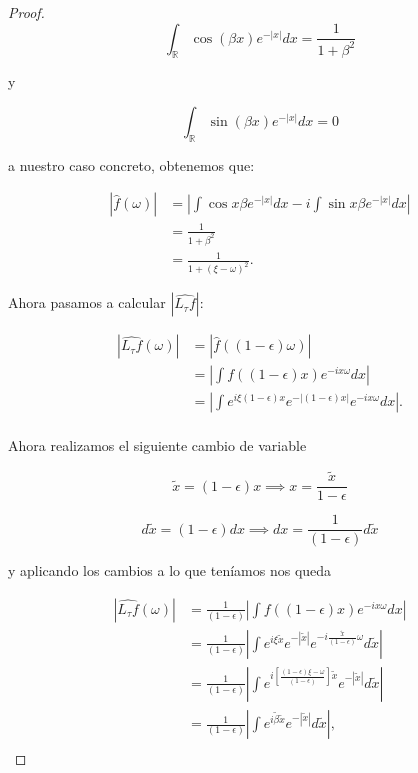 \begin{proof}
\begin{equation} \label{eq:res_auxiliar_1}
  \int_\mathbb{R} \cos(\beta x) e^{-|x|} dx= \frac{1}{1+\beta^2}
\end{equation}

\noindent y 

\begin{equation}\label{eq:res_auxiliar_2}
  \int_\mathbb{R} \sin(\beta x) e^{-|x|} dx= 0
\end{equation}

\noindent a nuestro caso concreto, obtenemos que: 

\begin{align*}
  |\widehat{f}(\omega)|&=\left|  \int{\cos{x\beta}e^{-|x|} dx} - i \int{\sin{x\beta}e^{-|x|} dx} \right| \\
  &=\frac{1}{1+\beta^2} \\
  &=\frac{1}{1+(\xi - \omega)^2}.
\end{align*} 

\noindent Ahora pasamos a calcular $|\widehat{L_\tau f}|$:

\begin{align*}
  |\widehat{L_\tau f}(\omega)| &= |\widehat{f}((1-\epsilon)\omega)| \\
  &=\left|  \int{f((1-\epsilon)x)e^{-ix\omega}dx}  \right | \\
  &=\left|  \int{e^{i \xi (1-\epsilon) x}e^{-|(1-\epsilon)x|}e^{-ix\omega}dx}  \right |. \\
\end{align*}

\noindent Ahora realizamos el siguiente cambio de variable

\begin{equation}
  \tilde{x}=(1-\epsilon) x \implies x=\frac{\tilde{x}}{1-\epsilon} 
\end{equation}

\begin{equation}
 d\tilde{x}=(1-\epsilon) dx \implies dx=\frac{1}{(1-\epsilon)}d\tilde{x}
\end{equation}

\noindent y aplicando los cambios a lo que teníamos nos queda

\begin{align*}
  |\widehat{L_\tau f}(\omega)| 
  &= \frac{1}{(1-\epsilon)}\left|  \int{f((1-\epsilon)x)e^{-ix\omega}dx}  \right | \\
  &=\frac{1}{(1-\epsilon)}\left|  \int{e^{i \xi \tilde{x}}e^{-|\tilde{x}|}e^{-i\frac{\tilde{x}}{(1-\epsilon)}\omega}d\tilde{x}}  \right | \\
  &=\frac{1}{(1-\epsilon)}\left|  \int{e^{i \left[ \frac{(1-\epsilon) \xi - \omega}{(1-\epsilon)}\right]\tilde{x}}e^{-|\tilde{x}|} d\tilde{x}}  \right | \\
  &=\frac{1}{(1-\epsilon)}\left|  \int{e^{i \tilde{\beta}\tilde{x}}e^{-|\tilde{x}|} d\tilde{x}}  \right |, \\
\end{align*}


\end{proof}
